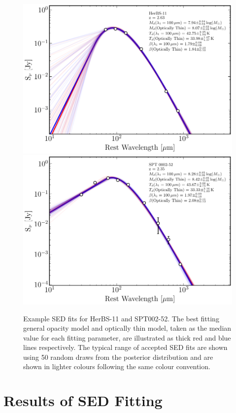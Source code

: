 \begin{figure}
	\centering
	\includegraphics[width=0.8\columnwidth]{Figures/herbs_sed_example.pdf}
	\includegraphics[width=0.8\columnwidth]{Figures/spt_sed_example.pdf}
	\caption{Example SED fits for HerBS-11 and SPT002-52. The best fitting general opacity model and optically thin model, taken as the median value for each fitting parameter, are illustrated as thick red and blue lines respectively. The typical range of accepted SED fits are shown using 50 random draws from the posterior distribution and are shown in lighter colours following the same colour convention.}
	\label{fig:example_SEDs}
\end{figure}

\section{Results of SED Fitting}

